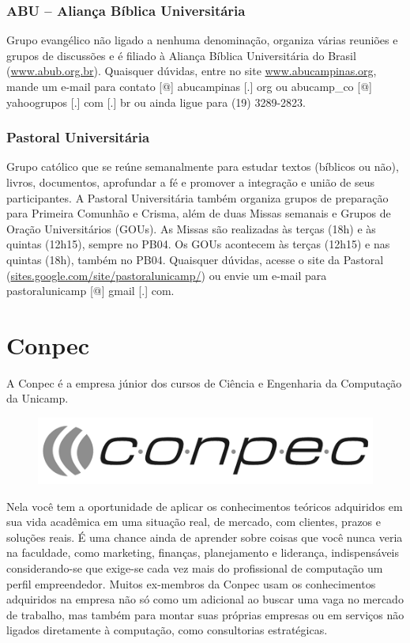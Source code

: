 \subsubsection{ABU -- Aliança Bíblica Universitária}

Grupo evangélico não ligado a nenhuma denominação, organiza várias reuniões
e grupos de discussões e é filiado à Aliança Bíblica Universitária do Brasil
(\url{www.abub.org.br}). Quaisquer dúvidas, entre no site
\url{www.abucampinas.org}, mande um e-mail para contato [@] abucampinas
[.] org ou abucamp\_co [@] yahoogrupos [.] com [.] br ou ainda ligue para (19)
3289-2823.

\subsubsection{Pastoral Universitária}

Grupo católico que se reúne semanalmente para estudar textos (bíblicos ou não),
livros, documentos, aprofundar a fé e promover a integração e união de seus
participantes. A Pastoral Universitária também organiza grupos de preparação
para Primeira Comunhão e Crisma, além de duas Missas semanais e Grupos de Oração
Universitários (GOUs). As Missas são realizadas às terças (18h) e às
quintas (12h15), sempre no PB04. Os GOUs acontecem às terças (12h15) e
nas quintas (18h), também no PB04. Quaisquer dúvidas, acesse o site da
Pastoral (\url{sites.google.com/site/pastoralunicamp/}) ou
envie um e-mail para pastoralunicamp [@] gmail [.] com.

\section{Conpec}

A Conpec é a empresa júnior dos cursos de Ciência e Engenharia da Computação da
Unicamp.
\begin{figure}[h!]
    \vspace{-10pt}
    \centering
    \includegraphics[scale=0.30, keepaspectratio=true]{img/imgs/19-conpec/logo_bw.png}
    \vspace{-10pt}
\end{figure}
Nela você tem a oportunidade de aplicar os conhecimentos teóricos
adquiridos em sua vida acadêmica em uma situação real, de mercado, com clientes,
prazos e soluções reais. É uma chance ainda de aprender sobre coisas que você
nunca veria na faculdade, como marketing, finanças, planejamento e liderança,
indispensáveis considerando-se que exige-se cada vez mais do profissional de
computação um perfil empreendedor. Muitos ex-membros da Conpec usam os
conhecimentos adquiridos na empresa não só como um adicional ao buscar uma vaga
no mercado de trabalho, mas também para montar suas próprias empresas ou em
serviços não ligados diretamente à computação, como consultorias estratégicas.

